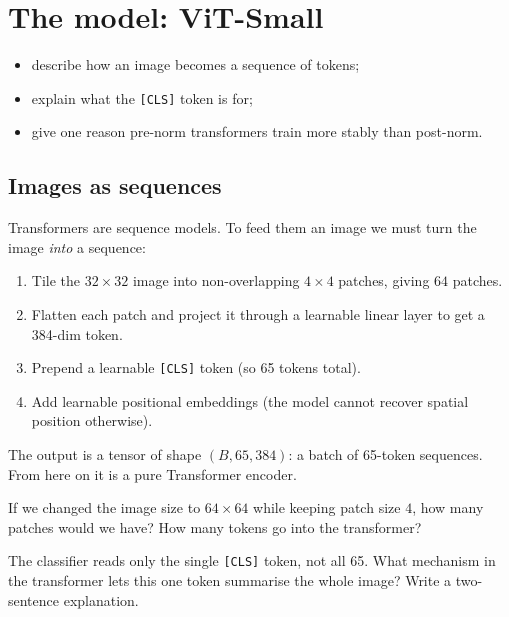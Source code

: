 \documentclass[11pt,a4paper]{article}
\newcounter{exercise}[section]
\newcommand{\answerspace}[1][3]{\vspace{#1\baselineskip}}
\newcommand{\stars}[1]{\textbf{\small(#1)}}
\begin{document}
\section{The model: ViT-Small}

\begin{objectives}
\begin{itemize}[leftmargin=*, itemsep=1pt]
    \item describe how an image becomes a sequence of tokens;
    \item explain what the \texttt{[CLS]} token is for;
    \item give one reason pre-norm transformers train more stably than post-norm.
\end{itemize}
\end{objectives}

\subsection{Images as sequences}

Transformers are sequence models. To feed them an image we must turn the image
\emph{into} a sequence:

\begin{enumerate}
\item Tile the $32 \times 32$ image into non-overlapping $4 \times 4$ patches, giving $64$ patches.
\item Flatten each patch and project it through a learnable linear layer to get a 384-dim token.
\item Prepend a learnable \texttt{[CLS]} token (so 65 tokens total).
\item Add learnable positional embeddings (the model cannot recover spatial position otherwise).
\end{enumerate}

The output is a tensor of shape $(B, 65, 384)$: a batch of 65-token sequences.
From here on it is a pure Transformer encoder.

\begin{exercise}[Token bookkeeping, \stars{1}]
If we changed the image size to $64 \times 64$ while keeping patch size $4$, how many
patches would we have? How many tokens go into the transformer?
\answerspace[1]
\end{exercise}

\begin{exercise}[Why \texttt{[CLS]}? \stars{2}]
The classifier reads only the single \texttt{[CLS]} token, not all 65. What mechanism in the
transformer lets this one token summarise the whole image? Write a two-sentence explanation.
\answerspace[3]
\end{exercise}
\end{document}
